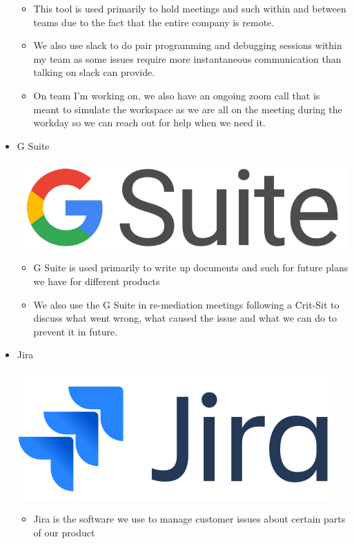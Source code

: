 \documentclass[11pt]{article} %
\begin{document}
\begin{itemize}
\begin{itemize}
\item This tool is used primarily to hold meetings and such within and between teams due to the fact that the entire company is remote.
\item We also use slack to do pair programming and debugging sessions within my team as some issues require more instantaneous communication than talking on slack can provide.
\item On team I'm working on,  we also have an ongoing zoom call that is meant to simulate the workspace as we are all on the meeting during the workday so we can reach out for help when we need it.
\end{itemize}
\item G Suite \\\\
\includegraphics[scale=0.1]{gsuite.png}
\begin{itemize}
\item G Suite is used primarily to write up documents and such for future plans we have for different products
\item We also use the G Suite in re-mediation meetings following a Crit-Sit to discuss what went wrong, what caused the issue and what we can do to prevent it in future.  
\end{itemize}
\item Jira \\\\
\includegraphics[scale=0.14]{jira.png}
\begin{itemize}
\item Jira is the software we use to manage customer issues about certain parts of our product

\end{itemize}
\end{itemize}
\end{document}
